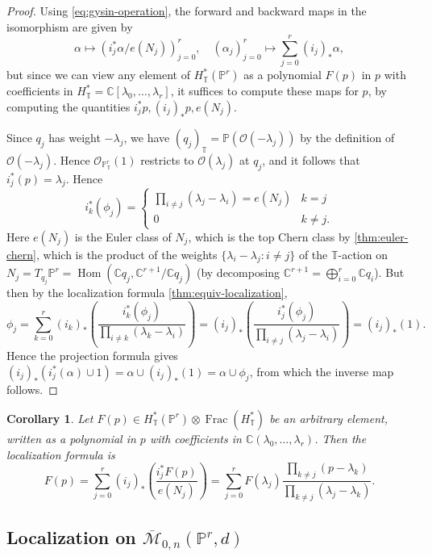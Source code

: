 \documentclass{report}
\theoremstyle{plain}
\newtheorem{corollary}[theorem]{Corollary}
\theoremstyle{definition}
\theoremstyle{remark}
\newcommand{\bC}{\mathbb{C}}
\newcommand{\bT}{\mathbb{T}}
\newcommand{\bP}{\mathbb{P}}
\newcommand{\cM}{\mathcal{M}}
\newcommand{\cO}{\mathcal{O}}
\DeclareMathOperator{\Hom}{Hom}
\DeclareMathOperator{\Frac}{Frac}
\newcommand{\cnj}{\overline}
\begin{document}
\begin{proof}
  Using \eqref{eq:gysin-operation}, the forward and backward maps in
  the isomorphism are given by
  \[ \alpha \mapsto (i_j^*\alpha / e(N_j))_{j=0}^r, \quad (\alpha_j)_{j=0}^r \mapsto \sum_{j=0}^r (i_j)_*\alpha, \]
  but since we can view any element of $H_{\bT}^*(\bP^r)$ as a
  polynomial $F(p)$ in $p$ with coefficients in $H_{\bT}^* =
  \bC[\lambda_0, \ldots, \lambda_r]$, it suffices to compute these
  maps for $p$, by computing the quantities $i_j^*p, (i_j)_*p,
  e(N_j)$.

  Since $q_j$ has weight $-\lambda_j$, we have $(q_j)_{\bT} =
  \bP(\cO(-\lambda_j))$ by the definition of $\cO(-\lambda_j)$. Hence
  $\cO_{\bP^r_{\bT}}(1)$ restricts to $\cO(\lambda_j)$ at $q_j$, and
  it follows that $i_j^*(p) = \lambda_j$. Hence
  \[ i_k^*(\phi_j) = \begin{cases} \prod_{i \neq j} (\lambda_j - \lambda_i) = e(N_j) & k = j \\ 0 & k \neq j. \end{cases} \]
  Here $e(N_j)$ is the Euler class of $N_j$, which is the top Chern
  class by \ref{thm:euler-chern}, which is the product of the weights
  $\{\lambda_i - \lambda_j : i \neq j\}$ of the $\bT$-action on $N_j =
  T_{q_j}\bP^r = \Hom(\bC q_j, \bC^{r+1}/\bC q_j)$ (by decomposing
  $\bC^{r+1} = \bigoplus_{i=0}^r \bC q_i$). But then by the
  localization formula \ref{thm:equiv-localization},
  \[ \phi_j = \sum_{k=0}^r (i_k)_*\left(\frac{i_k^*(\phi_j)}{\prod_{i \neq k} (\lambda_k - \lambda_i)}\right) = (i_j)_*\left(\frac{i_j^*(\phi_j)}{\prod_{i \neq j} (\lambda_j - \lambda_i)}\right) = (i_j)_*(1). \]
  Hence the projection formula gives $(i_j)_*(i_j^*(\alpha) \cup 1) =
  \alpha \cup (i_j)_*(1) = \alpha \cup \phi_j$, from which the inverse
  map follows.
\end{proof}

\begin{corollary}
  Let $F(p) \in H_{\bT}^*(\bP^r) \otimes \Frac(H_{\bT}^*)$ be an
  arbitrary element, written as a polynomial in $p$ with coefficients
  in $\bC(\lambda_0, \ldots, \lambda_r)$. Then the localization
  formula is
  \[ F(p) = \sum_{j=0}^r (i_j)_* \left(\frac{i_j^*F(p)}{e(N_j)}\right) = \sum_{j=0}^r F(\lambda_j) \frac{\prod_{k \neq j} (p - \lambda_k)}{\prod_{k \neq j} (\lambda_j - \lambda_k)}. \]
\end{corollary}

\subsection{Localization on \texorpdfstring{$\cnj{\cM}_{0,n}(\bP^r, d)$}{M\_\{0,n\}(P\^{}r,d)}}
\end{document}
